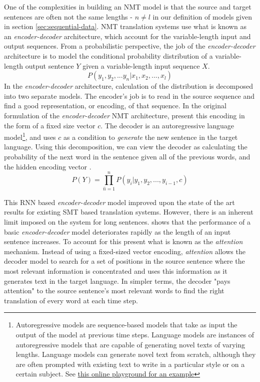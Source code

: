 \newcommand{\ed}{\emph{encoder-decoder}}
One of the complexities in building an NMT model is that the source and target sentences are often not the same lengths - $n \neq l$ in our definition of \seq{} models given in section \ref{sec:sequential-data}. NMT translation systems use what is known as an \ed{} architecture, which account for the variable-length input and output sequences. From a probabilistic perspective, the job of the \ed{} architecture is to model the conditional probability distribution of a variable-length output sentence $Y$ given a variable-length input sequence $X$. $$ P(y_1, y_2, ... y_n | x_1, x_2, ..., x_l)$$ In the \ed{} architecture, calculation of the distribution is decomposed into two separate models. The encoder's job is to read in the source sequence and find a good representation, or encoding, of that sequence. In the original formulation of the \ed{} NMT architecture, \citet{cho2014learning} present this encoding in the form of a fixed size vector $c$. The decoder is an autoregressive language model\footnote{Autoregressive models are sequence-based models that take as input the output of the model at previous time steps. Language models are instances of autoregressive models that are capable of generating novel texts of varying lengths. Language models can generate novel text from scratch, although they are often prompted with existing text to write in a particular style or on a certain subject. See \href{https://transformer.huggingface.co/doc/distil-gpt2}{this online playground for an example}}, and uses $c$ as a condition to \emph{generate} the new sentence in the target language. Using this decomposition, we can view the decoder as calculating the probability of the next word in the sentence given all of the previous words, and the hidden encoding vector \cite{bahdanau2014neural}. $$P(Y) = \prod_{\hat{n}=1}^{n}P(y_i \vert y_1, y_2, ..., y_{i-1}, c)$$

\newcommand{\at}[1]{\emph{#1}}

This RNN based \ed{} model improved upon the state of the art results for existing SMT based translation systems. However, there is an inherent limit imposed on the system for long sentences. \citet{cho2014learning} shows that the performance of a basic \ed{} model deteriorates rapidly as the length of an input sentence increases. To account for this 
\citet{bahdanau2014neural} present what is known as the \at{attention} mechanism. Instead of using a fixed-sized vector encoding, \at{attention} allows the decoder model to search for a set of positions in the source sentence where the most relevant information is concentrated and uses this information as it generates text in the target language. In simpler terms, the decoder "pays attention" to the source sentence's most relevant words to find the right translation of every word at each time step. 

